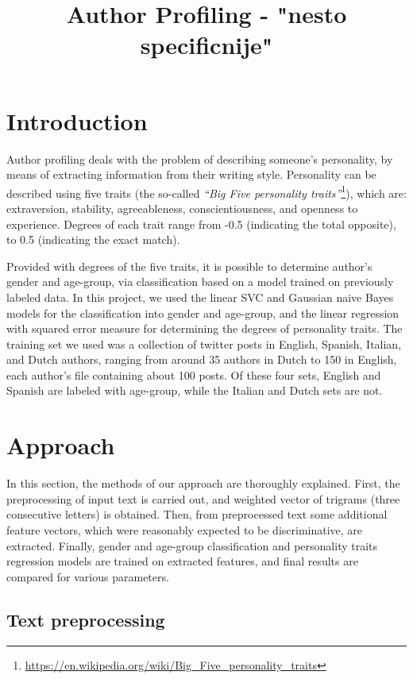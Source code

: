 \documentclass[10pt, a4paper]{article}
\title{Author Profiling - "nesto specificnije"}
\begin{document}
\maketitleabstract

\section{Introduction}

Author profiling deals with the problem of describing someone's personality, by means of extracting information from their writing style.
Personality can be described using five traits (the so-called \textit{``Big Five personality traits''}\footnote{\url{https://en.wikipedia.org/wiki/Big_Five_personality_traits}}), which are: extraversion, stability, agreeableness, conscientiousness, and openness to experience.
Degrees of each trait range from -0.5 (indicating the total opposite), to 0.5 (indicating the exact match).

Provided with degrees of the five traits, it is possible to determine author's gender and age-group, via classification based on a model trained on previously labeled data.
In this project, we used the linear SVC and Gaussian naive Bayes models for the classification into gender and age-group, and the linear regression with squared error measure for determining the degrees of personality traits.
The training set we used was a collection of twitter posts in English, Spanish, Italian, and Dutch authors, ranging from around 35 authors in Dutch to 150 in English, each author's file containing about 100 posts.
Of these four sets, English and Spanish are labeled with age-group, while the Italian and Dutch sets are not.

\section{Approach}

In this section, the methods of our approach are thoroughly explained.
First, the preprocessing of input text is carried out, and weighted vector of trigrams (three consecutive letters) is obtained.
Then, from preprocessed text some additional feature vectors, which were reasonably expected to be discriminative, are extracted.
Finally, gender and age-group classification and personality traits regression models are trained on extracted features, and final results are compared for various parameters.

\subsection{Text preprocessing}
\end{document}
